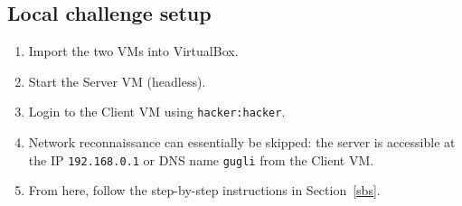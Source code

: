\documentclass[11pt, a4paper]{article}
\begin{document}
\subsection{Local challenge setup}

\begin{enumerate}
    \item Import the two VMs into VirtualBox.
    \item Start the Server VM (headless).
    \item Login to the Client VM using \texttt{hacker:hacker}.
    \item Network reconnaissance can essentially be skipped: the server is accessible at the IP \texttt{192.168.0.1} or DNS name \texttt{gugli}
    from the Client VM.
    \item From here, follow the step-by-step instructions in Section~\ref{sbs}.
\end{enumerate}


\end{document}
